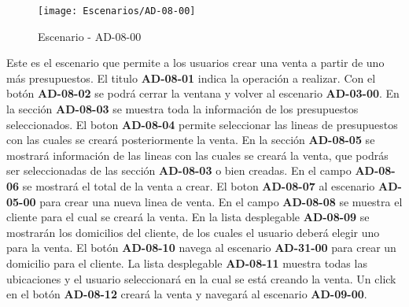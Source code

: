 \begin{figure}[H]
\centering
\texttt{[image: Escenarios/AD-08-00]}
\caption{Escenario - AD-08-00}
\label{fig:AD-08-00}
\end{figure}
Este es el escenario que permite a los usuarios crear una venta a partir de uno más presupuestos. El titulo \textbf{AD-08-01} indica la operación a realizar. Con el botón \textbf{AD-08-02} se podrá cerrar la ventana y volver al escenario \textbf{AD-03-00}.
En la sección \textbf{AD-08-03} se muestra toda la información de los presupuestos seleccionados. El boton \textbf{AD-08-04} permite seleccionar las lineas de presupuestos con las cuales se creará posteriormente la venta. En la sección \textbf{AD-08-05} se mostrará información de las lineas con las cuales se creará la venta, que podrás ser seleccionadas de las sección \textbf{AD-08-03} o bien creadas. En el campo \textbf{AD-08-06} se mostrará el total de la venta a crear. El boton \textbf{AD-08-07} al escenario \textbf{AD-05-00} para crear una nueva linea de venta.
En el campo \textbf{AD-08-08} se muestra el cliente para el cual se creará la venta. En la lista desplegable \textbf{AD-08-09} se mostrarán los domicilios del cliente, de los cuales el usuario deberá elegir uno para la venta. El botón \textbf{AD-08-10} navega al escenario \textbf{AD-31-00} para crear un domicilio para el cliente. La lista desplegable \textbf{AD-08-11} muestra todas las ubicaciones y el usuario seleccionará en la cual se está creando la venta. Un click en el botón \textbf{AD-08-12} creará la venta y navegará al escenario \textbf{AD-09-00}.
\clearpage
